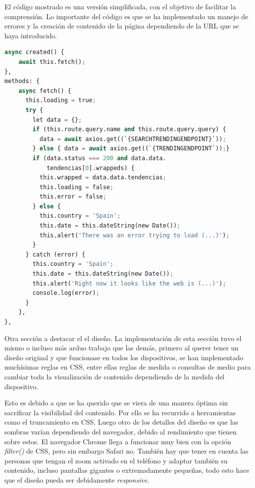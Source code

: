 El código mostrado es una versión simplificada, con el objetivo de facilitar la comprensión. Lo importante del código es que se ha implementado un manejo de errores y la creación de contenido de la página dependiendo de la URL que se haya introducido.

\vspace{0.3cm}

\begin{lstlisting}[caption=Funciones de carga de contenido en Vue,language=Python, mathescape=true]
async created() {
    await this.fetch();
},
methods: {
    async fetch() {
      this.loading = true;
      try {
        let data = {};
        if (this.route.query.name and this.route.query.query) {
          data = await axios.get((`{SEARCHTRENDINGENDPOINT}`));
        } else { data = await axios.get((`{TRENDINGENDPOINT`));}
        if (data.status === 200 and data.data.
            tendencias[0].wrappeds) {
          this.wrapped = data.data.tendencias;
          this.loading = false;
          this.error = false;
        } else {
          this.country = 'Spain';
          this.date = this.dateString(new Date());
          this.alert('There was an error trying to load (...)');
        }
      } catch (error) {
        this.country = 'Spain';
        this.date = this.dateString(new Date());
        this.alert('Right now it looks like the web is (...)');
        console.log(error);
      }
    },
},
\end{lstlisting}

Otra sección a destacar el el diseño. La implementación de esta sección tuvo el mismo o incluso más arduo trabajo que las demás, primero al querer tener un diseño original y que funcionase en todos los dispositivos, se han implementado muchísimas reglas en CSS, entre ellas reglas de medida o consultas de medio para cambiar toda la visualización de contenido dependiendo de la medida del dispositivo. 

\vspace{0.3cm}

Esto es debido a que se ha querido que se viera de una manera óptima sin sacrificar la visibilidad del contenido. Por ello se ha recurrido a herramientas como el truncamiento en CSS. Luego otro de los detalles del diseño es que las sombras varían dependiendo del navegador, debido al rendimiento que tienen sobre estos. El navegador Chrome llega a funcionar muy bien con la opción \textit{filter()} de CSS, pero sin embargo Safari no. También hay que tener en cuenta las personas que tengan el zoom activado en el teléfono y adaptar también su contenido, incluso pantallas gigantes o extremadamente pequeñas, todo esto hace que el diseño pueda ser debidamente \textit{responsive}.

